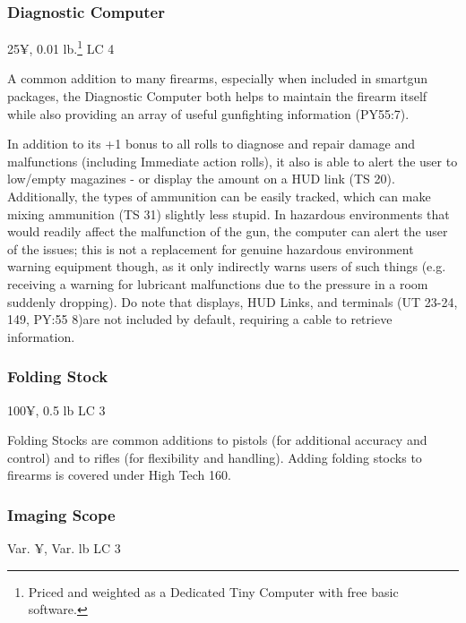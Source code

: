 \subsubsection{Diagnostic Computer}\label{diagnostic_computer}
25¥, 0.01 lb.\footnote{Priced and weighted as a Dedicated Tiny Computer with free basic software.} LC 4

A common addition to many firearms, especially when included in smartgun packages, the Diagnostic Computer both helps to maintain the firearm itself while also providing an array of useful gunfighting information (PY55:7). 

In addition to its +1 bonus to all rolls to diagnose and repair damage and malfunctions (including Immediate action rolls), it also is able to alert the user to low/empty magazines - or display the amount on a HUD link (TS 20). Additionally, the types of ammunition can be easily tracked, which can make mixing ammunition (TS 31) slightly less stupid. In hazardous environments that would readily affect the malfunction of the gun, the computer can alert the user of the issues; this is not a replacement for genuine hazardous environment warning equipment though, as it only indirectly warns users of such things (e.g. receiving a warning for lubricant malfunctions due to the pressure in a room suddenly dropping). Do note that displays, HUD Links, and terminals (UT 23-24, 149, PY:55 8)are not included by default, requiring a cable to retrieve information.

\subsubsection{Folding Stock}
100¥, 0.5 lb LC 3

Folding Stocks are common additions to pistols (for additional accuracy and control) and to rifles (for flexibility and handling). Adding folding stocks to firearms is covered under High Tech 160.

\subsubsection{Imaging Scope}
Var. ¥, Var. lb LC 3

